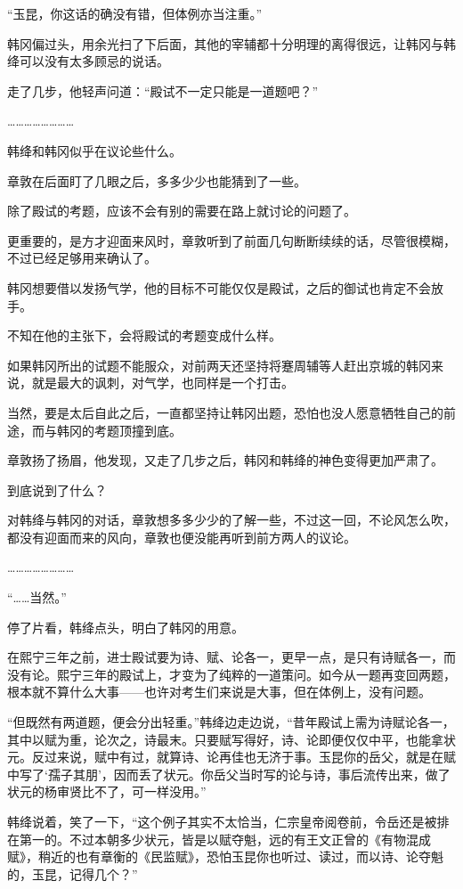 “玉昆，你这话的确没有错，但体例亦当注重。”

韩冈偏过头，用余光扫了下后面，其他的宰辅都十分明理的离得很远，让韩冈与韩绛可以没有太多顾忌的说话。

走了几步，他轻声问道：“殿试不一定只能是一道题吧？”

……………………

韩绛和韩冈似乎在议论些什么。

章敦在后面盯了几眼之后，多多少少也能猜到了一些。

除了殿试的考题，应该不会有别的需要在路上就讨论的问题了。

更重要的，是方才迎面来风时，章敦听到了前面几句断断续续的话，尽管很模糊，不过已经足够用来确认了。

韩冈想要借以发扬气学，他的目标不可能仅仅是殿试，之后的御试也肯定不会放手。

不知在他的主张下，会将殿试的考题变成什么样。

如果韩冈所出的试题不能服众，对前两天还坚持将蹇周辅等人赶出京城的韩冈来说，就是最大的讽刺，对气学，也同样是一个打击。

当然，要是太后自此之后，一直都坚持让韩冈出题，恐怕也没人愿意牺牲自己的前途，而与韩冈的考题顶撞到底。

章敦扬了扬眉，他发现，又走了几步之后，韩冈和韩绛的神色变得更加严肃了。

到底说到了什么？

对韩绛与韩冈的对话，章敦想多多少少的了解一些，不过这一回，不论风怎么吹，都没有迎面而来的风向，章敦也便没能再听到前方两人的议论。

……………………

“……当然。”

停了片看，韩绛点头，明白了韩冈的用意。

在熙宁三年之前，进士殿试要为诗、赋、论各一，更早一点，是只有诗赋各一，而没有论。熙宁三年的殿试上，才变为了纯粹的一道策问。如今从一题再变回两题，根本就不算什么大事——也许对考生们来说是大事，但在体例上，没有问题。

“但既然有两道题，便会分出轻重。”韩绛边走边说，“昔年殿试上需为诗赋论各一，其中以赋为重，论次之，诗最末。只要赋写得好，诗、论即便仅仅中平，也能拿状元。反过来说，赋中有过，就算诗、论再佳也无济于事。玉昆你的岳父，就是在赋中写了‘孺子其朋’，因而丢了状元。你岳父当时写的论与诗，事后流传出来，做了状元的杨审贤比不了，可一样没用。”

韩绛说着，笑了一下，“这个例子其实不太恰当，仁宗皇帝阅卷前，令岳还是被排在第一的。不过本朝多少状元，皆是以赋夺魁，远的有王文正曾的《有物混成赋》，稍近的也有章衡的《民监赋》，恐怕玉昆你也听过、读过，而以诗、论夺魁的，玉昆，记得几个？”

